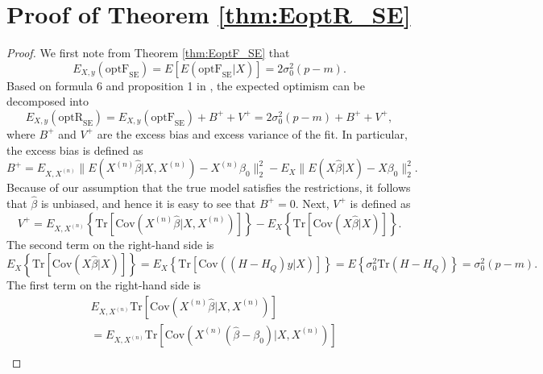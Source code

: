 \section{Proof of Theorem \ref{thm:EoptR_SE}}
\begin{proof}

We first note from Theorem \ref{thm:EoptF_SE} that
\begin{equation*}
E_{X,y}(\text{optF}_\text{SE}) = E \left[ E(\text{optF}_\text{SE} | X ) \right] = 2 \sigma_0^2(p-m).
\end{equation*}
Based on formula 6 and proposition 1 in , the expected optimism can be decomposed into 
\begin{equation*}
E_{X,y}(\text{optR}_\text{SE}) = E_{X,y}(\text{optF}_\text{SE}) + B^+ + V^+ = 2 \sigma_0^2(p-m) +  B^+ + V^+,
\end{equation*}
where $B^+$ and $V^+$ are the excess bias and excess variance of the fit. In particular, the excess bias is defined as
\begin{equation*}
B^+ = E_{X,X^{(n)}} \big\lVert E( X^{(n)} \hat{\beta} \big | X, X^{(n)} ) - X^{(n)} \beta_0 \big\rVert_2^2 - E_X \big\lVert E( X \hat{\beta} \big | X ) - X \beta_0 \big\rVert_2^2.
\end{equation*}
Because of our assumption that the true model satisfies the restrictions, it follows that $\hat{\beta}$ is unbiased, and hence it is easy to see that $B^+=0$. Next, $V^+$ is defined as
\begin{equation*}
V^+ = E_{X,X^{(n)}} \left\{ \text{Tr} \left[ \text{Cov}\left( X^{(n)}\hat{\beta} \big | X, X^{(n)} \right) \right] \right\} - E_X \left\{ \text{Tr} \left[ \text{Cov}\left( X\hat{\beta} \big | X \right)  \right] \right\}.
\end{equation*}
The second term on the right-hand side is
\begin{equation*}
E_X \left\{  \text{Tr} \left[ \text{Cov} \left( X\hat{\beta} \big | X \right)  \right] \right\} = E_X \left\{ \text{Tr} \left[ \text{Cov} \left( (H-H_Q)y \big | X \right)  \right] \right\} = E\left\{  \sigma_0^2 \text{Tr} \left( H-H_Q  \right) \right\}= \sigma_0^2 (p-m).
\end{equation*}
The first term on the right-hand side is
\begin{equation*}
\begin{aligned}
& E_{X,X^{(n)}} \text{Tr} \left[ \text{Cov}\left( X^{(n)}\hat{\beta} \big | X, X^{(n)} \right) \right] \\
&= E_{X,X^{(n)}} \text{Tr} \left[ \text{Cov} \left( X^{(n)} (\hat{\beta} -\beta_0) \big | X, X^{(n)} \right) \right] \\

\end{aligned}
\end{equation*}
\end{proof}
